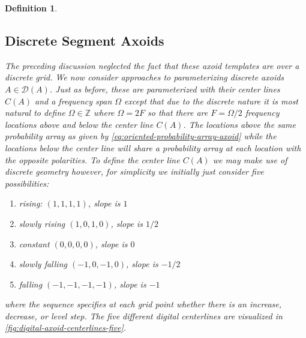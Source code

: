\documentclass[english]{article}
\newtheorem{defn}{Definition}[section]
\begin{document}
\begin{defn}
\subsection{Discrete Segment Axoids}

The preceding discussion neglected the fact that these axoid
templates are over a discrete grid.  We now consider approaches
to parameterizing discrete axoids $A\in\mathcal{D}(A)$.  Just
as before, these are parameterized with their center lines $C(A)$
and a frequency span $\Omega$ except that due to the discrete
nature it is most natural to define $\Omega\in\mathbb{Z}$
where $\Omega=2F$ so that there are $F=\Omega/2$ frequency locations
above and below the center line $C(A)$.  The locations above
the same probability array as given by \autoref{eq:oriented-probability-array-axoid}
while the locations below the center line will share a probability
array at each location with the opposite polarities.
To define the center line $C(A)$ we may make use of discrete geometry
\cite{Dorst86}
however, for simplicity we initially just consider five possibilities:
\begin{enumerate}
\item rising: $(1,1,1,1)$, slope is $1$
\item slowly rising $(1,0,1,0)$, slope is $1/2$
\item constant $(0,0,0,0)$, slope is $0$
\item slowly falling $(-1,0,-1,0)$, slope is $-1/2$
\item falling $(-1,-1,-1,-1)$, slope is $-1$
\end{enumerate}
where the sequence specifies at each grid point whether there
is an increase, decrease, or level step.  The five different
digital centerlines are visualized in \autoref{fig:digital-axoid-centerlines-five}.
\begin{figure}
\centering
\begin{subfigure}
\end{subfigure}
~
\begin{subfigure}
\end{subfigure}
\end{figure}
\end{defn}
\end{document}
